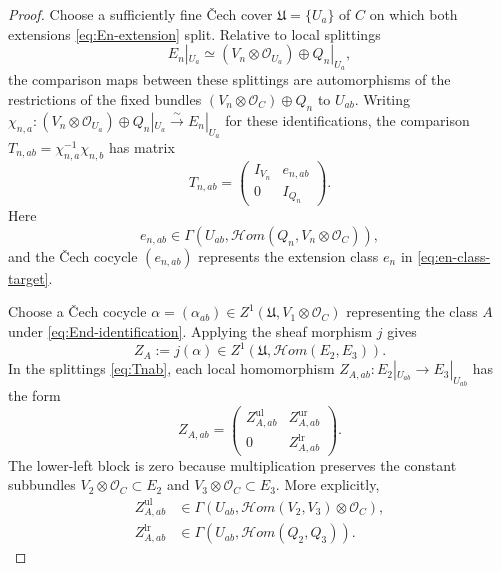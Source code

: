 \documentclass[11pt,a4paper,dvipsnames]{amsart}
\numberwithin{equation}{section}
\theoremstyle{plain}
\theoremstyle{definition}
\newcommand{\cO}{\mathcal O}
\newcommand{\cHom}{\mathcal{H}om}
\begin{document}
\begin{proof}
Choose a sufficiently fine \v Cech cover
$\mathfrak U=\{U_a\}$ of $C$ on which both extensions
\eqref{eq:En-extension} split.  Relative to local splittings
$$
 E_n|_{U_a}\simeq
 (V_n\otimes\cO_{U_a})\oplus Q_n|_{U_a},
$$
the comparison maps between these splittings are automorphisms of
the restrictions of the fixed bundles
$(V_n\otimes\cO_C)\oplus Q_n$ to $U_{ab}$.
Writing $\chi_{n,a}:(V_n\otimes\cO_{U_a})\oplus Q_n|_{U_a}
\xrightarrow{\sim}E_n|_{U_a}$ for these identifications, the comparison
$T_{n,ab}=\chi_{n,a}^{-1}\chi_{n,b}$ has matrix
\begin{equation}\label{eq:Tnab}
 T_{n,ab}=
 \begin{pmatrix}I_{V_n}&e_{n,ab}\\0&I_{Q_n}\end{pmatrix}.
\end{equation}
Here
$$
 e_{n,ab}\in
 \Gamma\!\left(U_{ab},
 \cHom(Q_n,V_n\otimes\cO_C)\right),
$$
and the \v Cech cocycle $(e_{n,ab})$ represents the extension class
$e_n$ in \eqref{eq:en-class-target}.

Choose a \v Cech cocycle
$\alpha=(\alpha_{ab})\in
Z^1(\mathfrak U,V_1\otimes\cO_C)$ representing the class $A$ under
\eqref{eq:End-identification}.  Applying the sheaf morphism $j$ gives
$$
 Z_A:=j(\alpha)\in
 Z^1\!\left(\mathfrak U,\cHom(E_2,E_3)\right).
$$
In the splittings \eqref{eq:Tnab}, each local homomorphism
$Z_{A,ab}:E_2|_{U_{ab}}\to E_3|_{U_{ab}}$ has the form
\begin{equation}\label{eq:ZA-blocks}
 Z_{A,ab}=
 \begin{pmatrix}
  Z_{A,ab}^{\mathrm{ul}}&Z_{A,ab}^{\mathrm{ur}}\\
  0&Z_{A,ab}^{\mathrm{lr}}
 \end{pmatrix}.
\end{equation}
The lower-left block is zero because multiplication preserves the constant
subbundles $V_2\otimes\cO_C\subset E_2$ and
$V_3\otimes\cO_C\subset E_3$.  More explicitly,
$$
\begin{aligned}
 Z_{A,ab}^{\mathrm{ul}}
 &\in\Gamma\!\left(
 U_{ab},\cHom(V_2,V_3)\otimes\cO_C\right),\\
 Z_{A,ab}^{\mathrm{lr}}
 &\in\Gamma\!\left(U_{ab},\cHom(Q_2,Q_3)\right).
\end{aligned}
$$


\end{proof}
\end{document}
